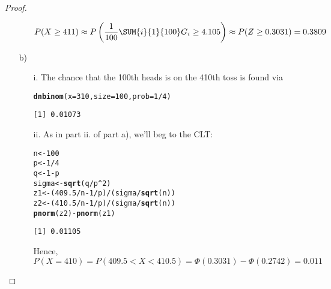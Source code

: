 \documentclass[12pt,titlepage]{article}\usepackage{graphicx, color}
\makeatletter
\newcommand{\hlfunctioncall}[1]{\textcolor[rgb]{0.501960784313725,0,0.329411764705882}{\textbf{#1}}}%
\newenvironment{kframe}{%
 \def\at@end@of@kframe{}%
 \ifinner\ifhmode%
  \def\at@end@of@kframe{\end{minipage}}%
  \begin{minipage}{\columnwidth}%
 \fi\fi%
 \def\FrameCommand##1{\hskip\@totalleftmargin \hskip-\fboxsep
 \colorbox{shadecolor}{##1}\hskip-\fboxsep
     \hskip-\linewidth \hskip-\@totalleftmargin \hskip\columnwidth}%
 \MakeFramed {\advance\hsize-\width
   \@totalleftmargin\z@ \linewidth\hsize
   \@setminipage}}%
 {\par\unskip\endMakeFramed%
 \at@end@of@kframe}
\newenvironment{knitrout}{}{} %
\makeatother
\begin{document}
\begin{proof}
\begin{enumerate}
\begin{enumerate}
\[
  P( X \geq 411 ) \approx P\left( \frac{1}{100} \SUM{i}{1}{100} G_i \geq 4.105 \right) \approx  P(Z \geq 0.3031) = 0.3809
\]
	\end{enumerate}
\item[b)]
  \begin{enumerate}
  \item[i.] The chance that the 100th heads is on the 410th toss is found via
\begin{knitrout}
\color{fgcolor}\begin{kframe}
\begin{alltt}
\hlfunctioncall{dnbinom}(x=310,size=100,prob=1/4)
\end{alltt}
\begin{verbatim}
[1] 0.01073
\end{verbatim}
\end{kframe}
\end{knitrout}

  \item[ii.] As in part ii. of part a), we'll beg to the CLT:
\begin{knitrout}
\color{fgcolor}\begin{kframe}
\begin{alltt}
n <- 100
p <- 1/4
q <- 1 - p
sigma <- \hlfunctioncall{sqrt}(q/p^2)
z1 <- (409.5/n - 1/p)/(sigma/\hlfunctioncall{sqrt}(n))
z2 <- (410.5/n - 1/p)/(sigma/\hlfunctioncall{sqrt}(n))
\hlfunctioncall{pnorm}(z2) - \hlfunctioncall{pnorm}(z1)
\end{alltt}
\begin{verbatim}
[1] 0.01105
\end{verbatim}
\end{kframe}
\end{knitrout}

  Hence, 
  \[
  P(X = 410) = P\left( 409.5 < X < 410.5 \right) = \Phi(0.3031) - \Phi(0.2742) = 0.011
  \]
  \end{enumerate}
\end{enumerate}
\end{proof}

\newcommand{\Xn}{\overline{X}_{(n)}}
\end{document}
